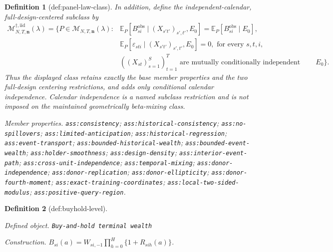 \documentclass{article}
\newtheorem{definition}{Definition}
\begin{document}
\begin{definition}[def:panel-law-class]
In addition, define the independent-calendar, full-design-centered subclass by
\[
\begin{aligned}
\mathcal M_{N,T,\mathbf n}^{\dagger,\mathrm{iid}}(\lambda)
=\bigl\{P\in\mathcal M_{N,T,\mathbf n}(\lambda):{}&
\mathbb E_P[B_{si}^{\mathrm{obs}}\mid (X_{s't'})_{s',t'},E_0]
=\mathbb E_P[B_{si}^{\mathrm{obs}}\mid E_0],\\
&\mathbb E_P[\varepsilon_{sti}\mid (X_{s't'})_{s',t'},E_0]=0,
\text{ for every }s,t,i,\\
&((X_{st})_{s=1}^{S})_{t=1}^{T}
\text{ are mutually conditionally independent given }E_0\bigr\}.
\end{aligned}
\]
Thus the displayed class retains exactly the base member properties and the two full-design centering restrictions, and adds only conditional calendar independence.  Calendar independence is a named subclass restriction and is not imposed on the maintained geometrically beta-mixing class.
\par\smallskip\noindent\emph{Member properties.} \texttt{ass:\allowbreak{}consistency}; \texttt{ass:\allowbreak{}historical-\allowbreak{}consistency}; \texttt{ass:\allowbreak{}no-\allowbreak{}spillovers}; \texttt{ass:\allowbreak{}limited-\allowbreak{}anticipation}; \texttt{ass:\allowbreak{}historical-\allowbreak{}regression}; \texttt{ass:\allowbreak{}event-\allowbreak{}transport}; \texttt{ass:\allowbreak{}bounded-\allowbreak{}historical-\allowbreak{}wealth}; \texttt{ass:\allowbreak{}bounded-\allowbreak{}event-\allowbreak{}wealth}; \texttt{ass:\allowbreak{}holder-\allowbreak{}smoothness}; \texttt{ass:\allowbreak{}design-\allowbreak{}density}; \texttt{ass:\allowbreak{}interior-\allowbreak{}event-\allowbreak{}path}; \texttt{ass:\allowbreak{}cross-\allowbreak{}unit-\allowbreak{}independence}; \texttt{ass:\allowbreak{}temporal-\allowbreak{}mixing}; \texttt{ass:\allowbreak{}donor-\allowbreak{}independence}; \texttt{ass:\allowbreak{}donor-\allowbreak{}replication}; \texttt{ass:\allowbreak{}donor-\allowbreak{}ellipticity}; \texttt{ass:\allowbreak{}donor-\allowbreak{}fourth-\allowbreak{}moment}; \texttt{ass:\allowbreak{}exact-\allowbreak{}training-\allowbreak{}coordinates}; \texttt{ass:\allowbreak{}local-\allowbreak{}two-\allowbreak{}sided-\allowbreak{}modulus}; \texttt{ass:\allowbreak{}positive-\allowbreak{}query-\allowbreak{}region}.
\end{definition}

\begin{definition}[def:buyhold-level]\label{def:buyhold-level}
\par\smallskip\noindent\emph{Defined object.} \texttt{Buy-\allowbreak{}and-\allowbreak{}hold terminal wealth}
\par\smallskip\noindent\emph{Construction.} \(B_{si}(a)=W_{si,-1}\prod_{h=0}^{H}\{1+R_{sih}(a)\}\).
\end{definition}
\end{document}
